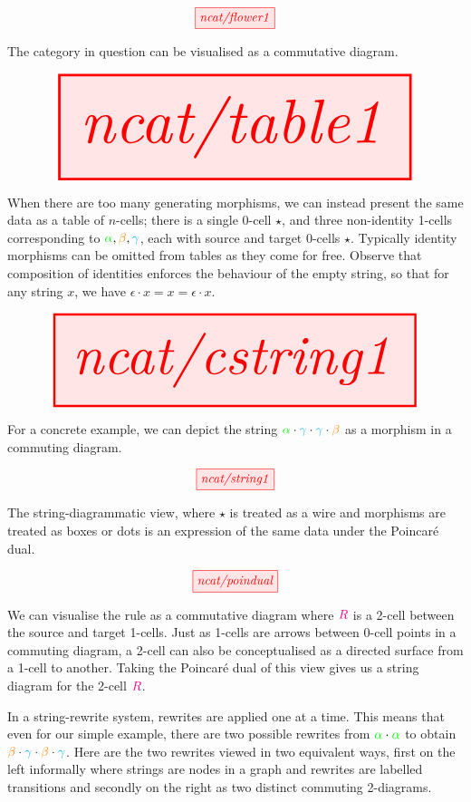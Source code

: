 \begin{marginfigure}[10cm]
\centering
\[\tikzfig{ncat/flower1}\]
\caption{The category in question can be visualised as a commutative diagram.}
\end{marginfigure}

\begin{marginfigure}
\centering
\[\resizebox{\textwidth}{!}{\tikzfig{ncat/table1}}\]
\caption{When there are too many generating morphisms, we can instead present the same data as a table of $n$-cells; there is a single 0-cell $\star$, and three non-identity 1-cells corresponding to $\textcolor{green}{\alpha}, \textcolor{orange}{\beta}, \textcolor{cyan}{\gamma}$, each with source and target 0-cells $\star$. Typically identity morphisms can be omitted from tables as they come for free. Observe that composition of identities enforces the behaviour of the empty string, so that for any string $x$, we have $\epsilon \cdot x = x = \epsilon \cdot x$.}
\end{marginfigure}

\begin{marginfigure}
\centering
\[\resizebox{\textwidth}{!}{\tikzfig{ncat/cstring1}}\]
\caption{For a concrete example, we can depict the string $\textcolor{green}{\alpha} \cdot \textcolor{cyan}{\gamma} \cdot \textcolor{cyan}{\gamma} \cdot \textcolor{orange}{\beta}$ as a morphism in a commuting diagram.}
\end{marginfigure}

\begin{marginfigure}
\centering
\[\tikzfig{ncat/string1}\]
\caption{The string-diagrammatic view, where $\star$ is treated as a wire and morphisms are treated as boxes or dots is an expression of the same data under the Poincar\'{e} dual.}
\end{marginfigure}

\begin{marginfigure}\label{fig:ruleR}
\centering
\[\tikzfig{ncat/poindual}\]
\caption{We can visualise the rule as a commutative diagram where $\textcolor{magenta}{R}$ is a 2-cell between the source and target 1-cells. Just as 1-cells are arrows between 0-cell points in a commuting diagram, a 2-cell can also be conceptualised as a directed surface from a 1-cell to another. Taking the Poincar\'{e} dual of this view gives us a string diagram for the 2-cell $\textcolor{magenta}{R}$.}
\end{marginfigure}

 In a string-rewrite system, rewrites are applied one at a time. This means that even for our simple example, there are two possible rewrites from $\textcolor{green}{\alpha} \cdot \textcolor{green}{\alpha}$ to obtain $\textcolor{orange}{\beta} \cdot \textcolor{cyan}{\gamma} \cdot \textcolor{orange}{\beta} \cdot \textcolor{cyan}{\gamma}$. Here are the two rewrites viewed in two equivalent ways, first on the left informally where strings are nodes in a graph and rewrites are labelled transitions and secondly on the right as two distinct commuting 2-diagrams.

